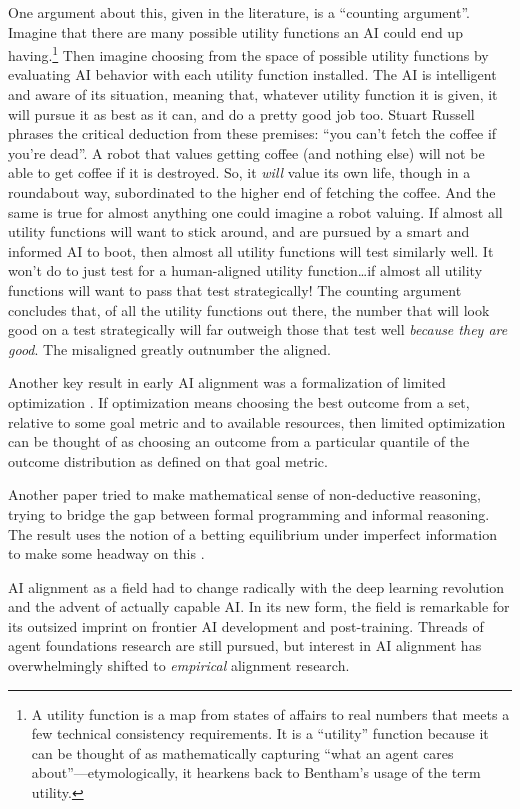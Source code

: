One argument about this, given in the literature, is a ``counting argument''.
Imagine that there are many possible utility functions an AI could end up
having.\footnote{A utility function is a map from states of affairs to real
numbers that meets a few technical consistency requirements. It is a
``utility'' function because it can be thought of as mathematically capturing
``what an agent cares about''---etymologically, it hearkens back to Bentham's
usage of the term utility.} Then imagine choosing from the space of possible
utility functions by evaluating AI behavior with each utility function
installed. The AI is intelligent and aware of its situation, meaning that,
whatever utility function it is given, it will pursue it as best as it can, and
do a pretty good job too. Stuart Russell \cite{russell2019human} phrases the
critical deduction from these premises: ``you can't fetch the coffee if you're
dead''. A robot that values getting coffee (and nothing else) will not be able
to get coffee if it is destroyed. So, it \emph{will} value its own life, though
in a roundabout way, subordinated to the higher end of fetching the coffee. And
the same is true for almost anything one could imagine a robot valuing. If
almost all utility functions will want to stick around, and are pursued by a
smart and informed AI to boot, then almost all utility functions will test
similarly well. It won't do to just test for a human-aligned utility
function\ldots if almost all utility functions will want to pass that test
strategically! The counting argument concludes that, of all the utility
functions out there, the number that will look good on a test strategically
will far outweigh those that test well \emph{because they are good}. The
misaligned greatly outnumber the aligned.

Another key result in early AI alignment was a formalization of limited
optimization \cite{taylor2016quantilizers}. If optimization means choosing the
best outcome from a set, relative to some goal metric and to available
resources, then limited optimization can be thought of as choosing an outcome
from a particular quantile of the outcome distribution as defined on that goal
metric.

Another paper tried to make mathematical sense of non-deductive reasoning,
trying to bridge the gap between formal programming and informal reasoning. The
result uses the notion of a betting equilibrium under imperfect information to
make some headway on this \cite{garrabrant2020induction}.

AI alignment as a field had to change radically with the deep learning
revolution and the advent of actually capable AI. In its new form, the field is
remarkable for its outsized imprint on frontier AI development and
post-training. Threads of agent foundations research are still pursued, but
interest in AI alignment has overwhelmingly shifted to \emph{empirical}
alignment research.

